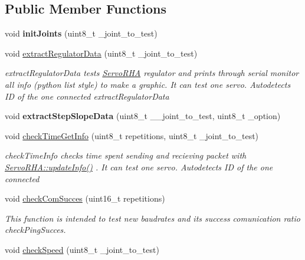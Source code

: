 \subsection*{Public Member Functions}
\begin{DoxyCompactItemize}
\item 
void {\bfseries init\+Joints} (uint8\+\_\+t \+\_\+joint\+\_\+to\+\_\+test)\hypertarget{classJHUtilitiesJH_aee0516d318cc57b20135ba62985976d9}{}\label{classJHUtilitiesJH_aee0516d318cc57b20135ba62985976d9}

\item 
void \hyperlink{classJHUtilitiesJH_a8e999fc3e4cb296cc0b0d1215b64ea36}{extract\+Regulator\+Data} (uint8\+\_\+t \+\_\+joint\+\_\+to\+\_\+test)\hypertarget{classJHUtilitiesJH_a8e999fc3e4cb296cc0b0d1215b64ea36}{}\label{classJHUtilitiesJH_a8e999fc3e4cb296cc0b0d1215b64ea36}

\begin{DoxyCompactList}\small\item\em extract\+Regulator\+Data tests \hyperlink{classServoRHA}{Servo\+R\+HA} regulator and prints through serial monitor all info (python list style) to make a graphic. It can test one servo. Autodetects ID of the one connected  extract\+Regulator\+Data \end{DoxyCompactList}\item 
void {\bfseries extract\+Step\+Slope\+Data} (uint8\+\_\+t \+\_\+\+\_\+joint\+\_\+to\+\_\+test, uint8\+\_\+t \+\_\+option)\hypertarget{classJHUtilitiesJH_a7100b2a400a9798bc52e386020fd8968}{}\label{classJHUtilitiesJH_a7100b2a400a9798bc52e386020fd8968}

\item 
void \hyperlink{classJHUtilitiesJH_abcb21d508b952a86aa7b31993b0c94ec}{check\+Time\+Get\+Info} (uint8\+\_\+t repetitions, uint8\+\_\+t \+\_\+joint\+\_\+to\+\_\+test)
\begin{DoxyCompactList}\small\item\em check\+Time\+Info checks time spent sending and recieving packet with \hyperlink{classServoRHA_a43b5aa2533b9b1c111ed3b39ac64e894}{Servo\+R\+H\+A\+::update\+Info()} . It can test one servo. Autodetects ID of the one connected \end{DoxyCompactList}\item 
void \hyperlink{classJHUtilitiesJH_a708939a7f00508e7b793c56ceca4e7b1}{check\+Com\+Succes} (uint16\+\_\+t repetitions)
\begin{DoxyCompactList}\small\item\em This function is intended to test new baudrates and it\textquotesingle{}s success comunication ratio  check\+Ping\+Succes. \end{DoxyCompactList}\item 
void \hyperlink{classJHUtilitiesJH_a93ac9a92d3e347c848dda4d3efae5b56}{check\+Speed} (uint8\+\_\+t \+\_\+joint\+\_\+to\+\_\+test)\hypertarget{classJHUtilitiesJH_a93ac9a92d3e347c848dda4d3efae5b56}{}\label{classJHUtilitiesJH_a93ac9a92d3e347c848dda4d3efae5b56}


\end{DoxyCompactItemize}
